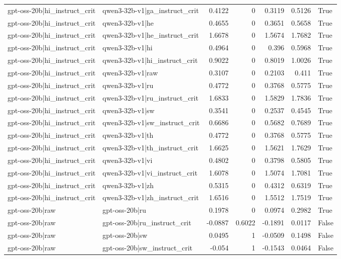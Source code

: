 \begin{table}
\begin{tabular}{l l r r r r l}
gpt-oss-20b|hi_instruct_crit & qwen3-32b-v1|ga_instruct_crit & 0.4122 & 0 & 0.3119 & 0.5126 & True \\
gpt-oss-20b|hi_instruct_crit & qwen3-32b-v1|he & 0.4655 & 0 & 0.3651 & 0.5658 & True \\
gpt-oss-20b|hi_instruct_crit & qwen3-32b-v1|he_instruct_crit & 1.6678 & 0 & 1.5674 & 1.7682 & True \\
gpt-oss-20b|hi_instruct_crit & qwen3-32b-v1|hi & 0.4964 & 0 & 0.396 & 0.5968 & True \\
gpt-oss-20b|hi_instruct_crit & qwen3-32b-v1|hi_instruct_crit & 0.9022 & 0 & 0.8019 & 1.0026 & True \\
gpt-oss-20b|hi_instruct_crit & qwen3-32b-v1|raw & 0.3107 & 0 & 0.2103 & 0.411 & True \\
gpt-oss-20b|hi_instruct_crit & qwen3-32b-v1|ru & 0.4772 & 0 & 0.3768 & 0.5775 & True \\
gpt-oss-20b|hi_instruct_crit & qwen3-32b-v1|ru_instruct_crit & 1.6833 & 0 & 1.5829 & 1.7836 & True \\
gpt-oss-20b|hi_instruct_crit & qwen3-32b-v1|sw & 0.3541 & 0 & 0.2537 & 0.4545 & True \\
gpt-oss-20b|hi_instruct_crit & qwen3-32b-v1|sw_instruct_crit & 0.6686 & 0 & 0.5682 & 0.7689 & True \\
gpt-oss-20b|hi_instruct_crit & qwen3-32b-v1|th & 0.4772 & 0 & 0.3768 & 0.5775 & True \\
gpt-oss-20b|hi_instruct_crit & qwen3-32b-v1|th_instruct_crit & 1.6625 & 0 & 1.5621 & 1.7629 & True \\
gpt-oss-20b|hi_instruct_crit & qwen3-32b-v1|vi & 0.4802 & 0 & 0.3798 & 0.5805 & True \\
gpt-oss-20b|hi_instruct_crit & qwen3-32b-v1|vi_instruct_crit & 1.6078 & 0 & 1.5074 & 1.7081 & True \\
gpt-oss-20b|hi_instruct_crit & qwen3-32b-v1|zh & 0.5315 & 0 & 0.4312 & 0.6319 & True \\
gpt-oss-20b|hi_instruct_crit & qwen3-32b-v1|zh_instruct_crit & 1.6516 & 0 & 1.5512 & 1.7519 & True \\
gpt-oss-20b|raw & gpt-oss-20b|ru & 0.1978 & 0 & 0.0974 & 0.2982 & True \\
gpt-oss-20b|raw & gpt-oss-20b|ru_instruct_crit & -0.0887 & 0.6022 & -0.1891 & 0.0117 & False \\
gpt-oss-20b|raw & gpt-oss-20b|sw & 0.0495 & 1 & -0.0509 & 0.1498 & False \\
gpt-oss-20b|raw & gpt-oss-20b|sw_instruct_crit & -0.054 & 1 & -0.1543 & 0.0464 & False \\

\end{tabular}
\end{table}
